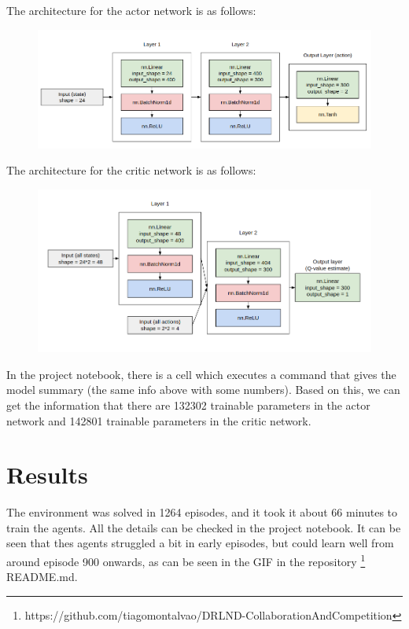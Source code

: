 \documentclass{article}
\begin{document}
The architecture for the actor network is as follows:

\begin{figure}[H]
\centering
\includegraphics[scale=0.4]{img/actor_arch.png}
\label{fig:actor_arch}
\end{figure}

The architecture for the critic network is as follows:

\begin{figure}[H]
\centering
\includegraphics[scale=0.45]{img/critic_arch.png}
\label{fig:critic_arch}
\end{figure}

In the project notebook, there is a cell which executes a command that gives the model summary (the same info above with some numbers). Based on this, we can get the information that there are 132302 trainable parameters in the actor network and 142801 trainable parameters in the critic network.

\section{Results}

The environment was solved in 1264 episodes, and it took it about 66 minutes to train the agents. All the details can be checked in the project notebook. It can be seen that thes agents struggled a bit in early episodes, but could learn well from around episode 900 onwards, as can be seen in the GIF in the repository \footnote{https://github.com/tiagomontalvao/DRLND-CollaborationAndCompetition} README.md.
\end{document}
